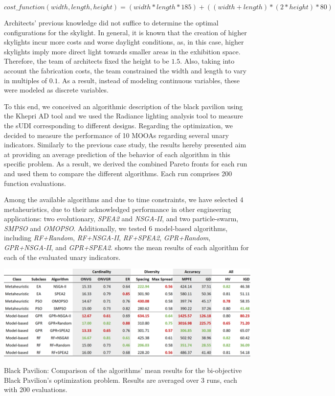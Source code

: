 \begin{equation} \label{eq:costanalysis}
cost\_function(width, length, height) = (width * length * 185) + ((width + length) * ( 2 * height) * 80)
\end{equation}

Architects' previous knowledge did not suffice to determine the optimal configurations for the skylight. In general, it is known that the creation of higher skylights incur more costs and worse daylight conditions, as, in this case, higher skylights imply more direct light towards smaller areas in the exhibition space. Therefore, the team of architects fixed the height to be $1.5$\metre. Also, taking into account the fabrication costs, the team constrained the width and length to vary in multiples of $0.1$\metre. As a result, instead of modeling continuous variables, these were modeled as discrete variables.

To this end, we conceived an algorithmic description of the black pavilion using the Khepri \ac{AD} tool and we used the Radiance lighting analysis tool to measure the \ac{sUDI} corresponding to different designs. Regarding the optimization, we decided to measure the performance of 10 \acp{MOOA} regarding several unary indicators. Similarly to the previous case study, the results hereby presented aim at providing an average prediction of the behavior of each algorithm in this specific problem. As a result, we derived the combined Pareto fronts for each run and used them to compare the different algorithms. Each run comprises 200 function evaluations.

Among the available algorithms and due to time constraints, we have selected 4 metaheuristics, due to their acknowledged performance in other engineering applications: two evolutionary, \textit{\ac{SPEA2}} and \textit{\ac{NSGA-II}}, and two particle-swarm, \textit{SMPSO} and \textit{OMOPSO}. Additionally, we tested 6 model-based algorithms, including \textit{RF+Random}, \textit{RF+NSGA-II}, \textit{RF+SPEA2}, \textit{GPR+Random}, \textit{GPR+NSGA-II}, and \textit{GPR+SPEA2}.  shows the mean results of each algorithm for each of the evaluated unary indicators. 

\begin{table}[htbp]
	\centering
	\includegraphics[width=\textwidth]{Images/Evaluation/BlackPavilion/Results_Mean_20190416.PNG}
	\caption[Black Pavilion: Mean performance values of the algorithms' results]{Black Pavilion: Comparison of the algorithms' mean results for the bi-objective Black Pavilion's optimization problem. Results are averaged over 3 runs, each with 200 evaluations.}
	\label{table:blackpavilion}
\end{table}

